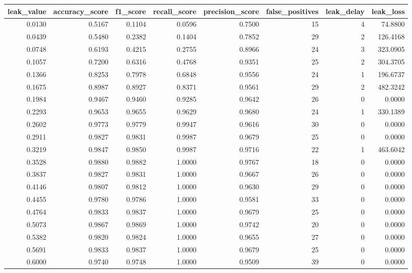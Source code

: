 \begin{tabular}{rrrrrrrr}
\toprule
leak\_value & accuracy\_score & f1\_score & recall\_score & precision\_score & false\_positives & leak\_delay & leak\_loss \\
\midrule
0.0130 & 0.5167 & 0.1104 & 0.0596 & 0.7500 & 15 & 4 & 74.8800 \\
0.0439 & 0.5480 & 0.2382 & 0.1404 & 0.7852 & 29 & 2 & 126.4168 \\
0.0748 & 0.6193 & 0.4215 & 0.2755 & 0.8966 & 24 & 3 & 323.0905 \\
0.1057 & 0.7200 & 0.6316 & 0.4768 & 0.9351 & 25 & 2 & 304.3705 \\
0.1366 & 0.8253 & 0.7978 & 0.6848 & 0.9556 & 24 & 1 & 196.6737 \\
0.1675 & 0.8987 & 0.8927 & 0.8371 & 0.9561 & 29 & 2 & 482.3242 \\
0.1984 & 0.9467 & 0.9460 & 0.9285 & 0.9642 & 26 & 0 & 0.0000 \\
0.2293 & 0.9653 & 0.9655 & 0.9629 & 0.9680 & 24 & 1 & 330.1389 \\
0.2602 & 0.9773 & 0.9779 & 0.9947 & 0.9616 & 30 & 0 & 0.0000 \\
0.2911 & 0.9827 & 0.9831 & 0.9987 & 0.9679 & 25 & 0 & 0.0000 \\
0.3219 & 0.9847 & 0.9850 & 0.9987 & 0.9716 & 22 & 1 & 463.6042 \\
0.3528 & 0.9880 & 0.9882 & 1.0000 & 0.9767 & 18 & 0 & 0.0000 \\
0.3837 & 0.9827 & 0.9831 & 1.0000 & 0.9667 & 26 & 0 & 0.0000 \\
0.4146 & 0.9807 & 0.9812 & 1.0000 & 0.9630 & 29 & 0 & 0.0000 \\
0.4455 & 0.9780 & 0.9786 & 1.0000 & 0.9581 & 33 & 0 & 0.0000 \\
0.4764 & 0.9833 & 0.9837 & 1.0000 & 0.9679 & 25 & 0 & 0.0000 \\
0.5073 & 0.9867 & 0.9869 & 1.0000 & 0.9742 & 20 & 0 & 0.0000 \\
0.5382 & 0.9820 & 0.9824 & 1.0000 & 0.9655 & 27 & 0 & 0.0000 \\
0.5691 & 0.9833 & 0.9837 & 1.0000 & 0.9679 & 25 & 0 & 0.0000 \\
0.6000 & 0.9740 & 0.9748 & 1.0000 & 0.9509 & 39 & 0 & 0.0000 \\
\bottomrule
\end{tabular}
